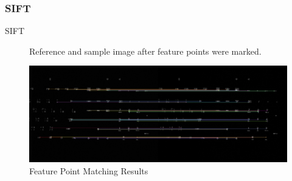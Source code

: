		\subsubsection{SIFT}
		SIFT 
		\begin{figure}[H]
			\caption{Reference and sample image after feature points were marked.}
			\label{fig:siftFeaturePoints}
		\end{figure}
		\begin{figure}[H]
			\includegraphics[width=\linewidth]{figsrc/simulation/normal/sift_matches.png}
			\caption{Feature Point Matching Results}
			\label{fig:sifeMatchingResult}
		\end{figure}
